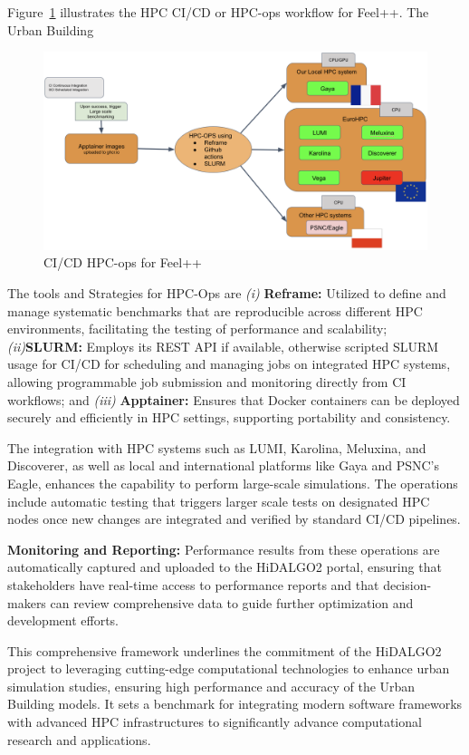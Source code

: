 \documentclass[runningheads]{llncs}
\begin{document}
Figure~\ref{fig:feelpp-hpcops} illustrates the HPC CI/CD or HPC-ops workflow for Feel++. The Urban Building 
\begin{figure}
    \centering
    \includegraphics[width=\textwidth]{images/feelpp-hpcops.png}
    \caption{CI/CD HPC-ops for Feel++}
    \label{fig:feelpp-hpcops}
\end{figure}

The tools and Strategies for HPC-Ops are  \textit{(i) }\textbf{Reframe:} Utilized to define and manage systematic benchmarks that are reproducible across different HPC environments, facilitating the testing of performance and scalability;
\textit{(ii)}\textbf{SLURM:} Employs its REST API if available, otherwise scripted SLURM usage for CI/CD for scheduling and managing jobs on integrated HPC systems, allowing programmable job submission and monitoring directly from CI workflows; and \textit{(iii)} \textbf{Apptainer:} Ensures that Docker containers can be deployed securely and efficiently in HPC settings, supporting portability and consistency.

The integration with HPC systems such as LUMI, Karolina, Meluxina, and Discoverer, as well as local and international platforms like Gaya and PSNC's Eagle, enhances the capability to perform large-scale simulations. The operations include automatic testing that triggers larger scale tests on designated HPC nodes once new changes are integrated and verified by standard CI/CD pipelines.

\textbf{Monitoring and Reporting:}
Performance results from these operations are automatically captured and uploaded to the HiDALGO2 portal, ensuring that stakeholders have real-time access to performance reports and that decision-makers can review comprehensive data to guide further optimization and development efforts.

This comprehensive framework underlines the commitment of the HiDALGO2 project to leveraging cutting-edge computational technologies to enhance urban simulation studies, ensuring high performance and accuracy of the Urban Building models. It sets a benchmark for integrating modern software frameworks with advanced HPC infrastructures to significantly advance computational research and applications.
\end{document}

